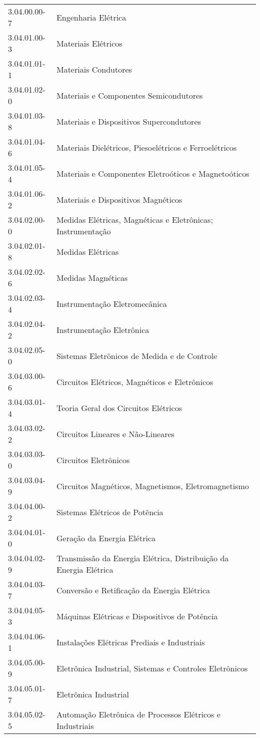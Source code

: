 \begin{longtable}[c]{p{2.15cm}p{13cm}}
3.04.00.00-7 & Engenharia Elétrica \\
3.04.01.00-3 & Materiais Elétricos \\
3.04.01.01-1 & Materiais Condutores \\
3.04.01.02-0 & Materiais e Componentes Semicondutores \\
3.04.01.03-8 & Materiais e Dispositivos Supercondutores \\
3.04.01.04-6 & Materiais Dielétricos, Piesoelétricos e Ferroelétricos \\
3.04.01.05-4 & Materiais e Componentes Eletroóticos e Magnetoóticos \\
3.04.01.06-2 & Materiais e Dispositivos Magnéticos \\
3.04.02.00-0 & Medidas Elétricas, Magnéticas e Eletrônicas; Instrumentação \\
3.04.02.01-8 & Medidas Elétricas \\
3.04.02.02-6 & Medidas Magnéticas \\
3.04.02.03-4 & Instrumentação Eletromecânica \\
3.04.02.04-2 & Instrumentação Eletrônica \\
3.04.02.05-0 & Sistemas Eletrônicos de Medida e de Controle \\
3.04.03.00-6 & Circuitos Elétricos, Magnéticos e Eletrônicos \\
3.04.03.01-4 & Teoria Geral dos Circuitos Elétricos \\
3.04.03.02-2 & Circuitos Lineares e Não-Lineares \\
3.04.03.03-0 & Circuitos Eletrônicos \\
3.04.03.04-9 & Circuitos Magnéticos, Magnetismos, Eletromagnetismo \\
3.04.04.00-2 & Sistemas Elétricos de Potência \\
3.04.04.01-0 & Geração da Energia Elétrica \\
3.04.04.02-9 & Transmissão da Energia Elétrica, Distribuição da Energia Elétrica \\
3.04.04.03-7 & Conversão e Retificação da Energia Elétrica \\
3.04.04.05-3 & Máquinas Elétricas e Dispositivos de Potência \\
3.04.04.06-1 & Instalações Elétricas Prediais e Industriais \\
3.04.05.00-9 & Eletrônica Industrial, Sistemas e Controles Eletrônicos \\
3.04.05.01-7 & Eletrônica Industrial \\
3.04.05.02-5 & Automação Eletrônica de Processos Elétricos e Industriais \\

\end{longtable}
